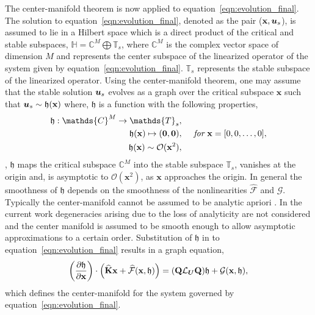 The center-manifold theorem is now applied to equation~\eqref{eqn:evolution_final}. 	The solution to equation~\eqref{eqn:evolution_final}, denoted as the pair ($\mathbf{x},\boldsymbol{u}_{s}$), is assumed to lie in a Hilbert space which is a direct product of the critical and stable subspaces, $\mathds{H} = \mathds{C}^{M} \bigoplus \mathds{T}_{s}$, where $\mathds{C}^{M}$ is the complex vector space of dimension $M$ and represents the center subspace of the linearized operator of the system given by equation~\eqref{eqn:evolution_final}. $\mathds{T}_{s}$ represents the stable subspace of the linearized operator. 
%
Using the center-manifold theorem, one may assume that the stable solution $\boldsymbol{u}_{s}$ evolves as a graph over the critical subspace $\mathbf{x}$ such that $\boldsymbol{u}_{s} \sim \mathfrak{h}(\mathbf{x})$ where, $\mathfrak{h}$ is a function with the following properties,
\begin{eqnarray}
	\label{eqn:CM_approx_properties}
	\mathfrak{h}: \mathds{C}^{M} \to \mathds{T}_{s}, & \nonumber \\
	\mathfrak{h}(\mathbf{x}) \mapsto (\boldsymbol{0},\vfield{0}), & \hspace{5mm} \textit{for}\ \mathbf{x} = [0,0,\ldots,0] , \nonumber \\
	\mathfrak{h}(\mathbf{x}) \sim \mathcal{O}(\mathbf{x}^{2}), & \nonumber
\end{eqnarray}
\ie, $\mathfrak{h}$ maps the critical subspace $\mathds{C}^{M}$ into the stable subspace $\mathds{T}_{s}$, vanishes at the origin and, is asymptotic to $\mathcal{O}(\mathbf{x}^{2})$, as $\mathbf{x}$ approaches the origin. 
In general the smoothness of $\mathfrak{h}$ depends on the smoothness of the nonlinearities $\mathcal{\widehat{F}}$ and $\mathcal{G}$. Typically the center-manifold cannot be assumed to be analytic apriori \citep{carr82,sijbrand85}. In the current work degeneracies arising due to the loss of analyticity are not considered and the center manifold is assumed to be smooth enough to allow asymptotic approximations to a certain order. Substitution of $\mathfrak{h}$ in to equation~\eqref{eqn:evolution_final} results in a graph equation,
\begin{align}
	\label{eqn:graph_equation}
	\left(\frac{\partial \mathfrak{h}}{\partial \mathbf{x}}\right)\cdot \left(\mathbf{\widehat{K}}\mathbf{x} + \mathcal{\widehat{F}}(\mathbf{x},\mathfrak{h}) \right) = (\mathbf{Q}\mathcal{L}_{\boldsymbol{U}}\mathbf{Q})\mathfrak{h} + \mathcal{G}(\mathbf{x},\mathfrak{h}),
\end{align}
which defines the center-manifold for the system governed by equation~\eqref{eqn:evolution_final}. 


